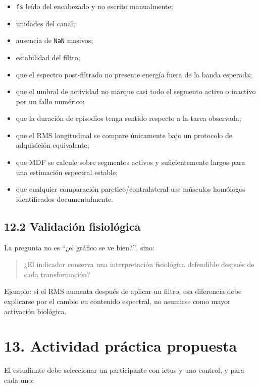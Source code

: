 \documentclass[
  spanish,
  a4paper,
  DIV=11,
  numbers=noendperiod]{scrreprt}
\providecommand{\tightlist}{%
  \setlength{\itemsep}{0pt}\setlength{\parskip}{0pt}}
\begin{document}
\begin{itemize}
\tightlist
\item
  \texttt{fs} leído del encabezado y no escrito manualmente;
\item
  unidades del canal;
\item
  ausencia de \texttt{NaN} masivos;
\item
  estabilidad del filtro;
\item
  que el espectro post-filtrado no presente energía fuera de la banda
  esperada;
\item
  que el umbral de actividad no marque casi todo el segmento activo o
  inactivo por un fallo numérico;
\item
  que la duración de episodios tenga sentido respecto a la tarea
  observada;
\item
  que el RMS longitudinal se compare únicamente bajo un protocolo de
  adquisición equivalente;
\item
  que MDF se calcule sobre segmentos activos y suficientemente largos
  para una estimación espectral estable;
\item
  que cualquier comparación paretico/contralateral use músculos
  homólogos identificados documentalmente.
\end{itemize}

\section{12.2 Validación
fisiológica}\label{validaciuxf3n-fisioluxf3gica}

La pregunta no es ``¿el gráfico se ve bien?'', sino:

\begin{quote}
¿El indicador conserva una interpretación fisiológica defendible después
de cada transformación?
\end{quote}

Ejemplo: si el RMS aumenta después de aplicar un filtro, esa diferencia
debe explicarse por el cambio en contenido espectral, no asumirse como
mayor activación biológica.

\chapter{13. Actividad práctica
propuesta}\label{actividad-pruxe1ctica-propuesta}

El estudiante debe seleccionar un participante con ictus y uno control,
y para cada uno:
\end{document}

